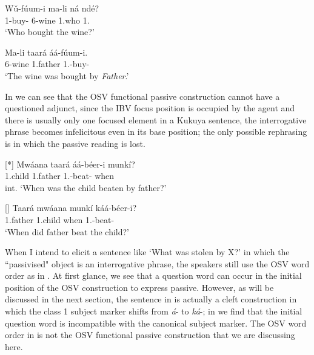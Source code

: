 \documentclass[output=paper,colorlinks,citecolor=brown,
]{langscibook}
\begin{document}
\begin{exe}
    \ex \label{121}
    \begin{xlist}
\ex
\label{121a}
\gll
Wǔ-fúum-i ma-li ná ndé?\\
1\Rel{}-buy-\Pst{} 6-wine 1.who 1.\Pro{}\\
\trans ‘Who bought the wine?’

\ex
\label{121b}
\gll
Ma-li taará áá-fúum-i.\\
6-wine 1.father 1\Sm{}.\Pst{}-buy-\Pst{}\\
\trans ‘The wine was bought by \textit{Father}.’ 

    \end{xlist} 
\end{exe}   
In  we can see that the OSV functional passive construction cannot have a questioned adjunct, since the IBV focus position is occupied by the agent and there is usually only one focused element in a Kukuya sentence, the interrogative phrase becomes infelicitous even in its base position; the only possible rephrasing is  in which the passive reading is lost. 
\begin{exe}
    \ex \label{122}
    \begin{xlist}
\ex
[*]{
\label{122a}
\gll
Mwáana taará áá-béer-i munkí?\\
1.child 1.father 1\Sm{}.\Pst{}-beat-\Pst{} when\\
\trans int. ‘When was the child beaten by father?’
}

\ex
[]{
\label{122b}
\gll
Taará mwáana munkí káá-béer-i?\\
1.father 1.child when 1\Sm{}.\Pst{}-beat-\Pst{}\\
\trans ‘When did father beat the child?’
}

    \end{xlist}
\end{exe}
When I intend to elicit a sentence like `What was stolen by X?' in which the ``passivised" object is an interrogative phrase, the speakers still use the OSV word order as in . At first glance, we see that a question word can occur in the initial position of the OSV construction to express passive. However, as will be discussed in the next section, the sentence in  is actually a cleft construction in which the class 1 subject marker shifts from \textit{á}- to \textit{ká}-; in  we find that the initial question word is incompatible with the canonical subject marker. The OSV word order in  is not the OSV functional passive construction that we are discussing here.
\end{document}
